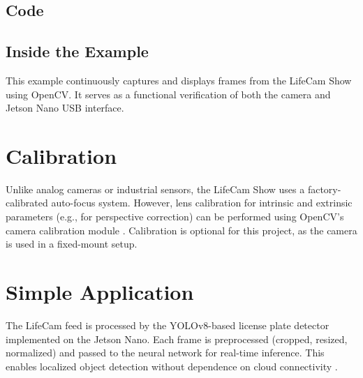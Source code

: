 
\subsection{Code}


\subsection{Inside the Example}
This example continuously captures and displays frames from the LifeCam Show using OpenCV. 
It serves as a functional verification of both the camera and Jetson Nano \ac{USB} interface.

\section{Calibration}
Unlike analog cameras or industrial sensors, the LifeCam Show uses a factory-calibrated auto-focus system.  
However, lens calibration for intrinsic and extrinsic parameters (e.g., for perspective correction) can be performed using OpenCV’s camera calibration module \cite{opencv_doc_2024}.  
Calibration is optional for this project, as the camera is used in a fixed-mount setup.

\section{Simple Application}
The LifeCam feed is processed by the YOLOv8-based license plate detector implemented on the Jetson Nano.  
Each frame is preprocessed (cropped, resized, normalized) and passed to the neural network for real-time inference.  
This enables localized object detection without dependence on cloud connectivity \cite{edgeAIbook}.


